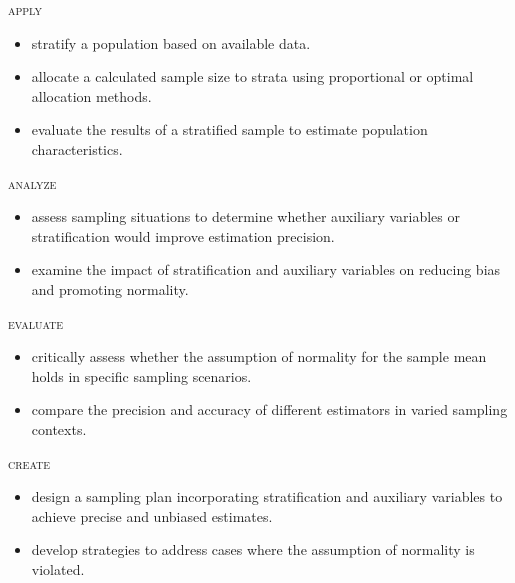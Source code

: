 \noindent \textsc{apply}
\begin{itemize}

\item stratify a population based on available data.
\item allocate a calculated sample size to strata using proportional or optimal allocation methods.
\item evaluate the results of a stratified sample to estimate population characteristics.
\end{itemize}

\noindent \textsc{analyze}
\begin{itemize}

\item assess sampling situations to determine whether auxiliary variables or stratification would improve estimation precision.
\item examine the impact of stratification and auxiliary variables on reducing bias and promoting normality.
\end{itemize}

\noindent \textsc{evaluate}
\begin{itemize}

\item critically assess whether the assumption of normality for the sample mean holds in specific sampling scenarios.
\item compare the precision and accuracy of different estimators in varied sampling contexts.
\end{itemize}

\noindent \textsc{create}
\begin{itemize}

\item design a sampling plan incorporating stratification and auxiliary variables to achieve precise and unbiased estimates.
\item develop strategies to address cases where the assumption of normality is violated.

\end{itemize}


